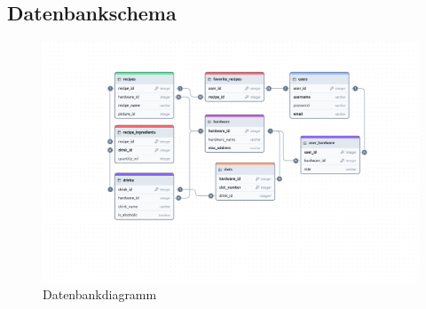 \newpage
\subsection{Datenbankschema}

\begin{figure}[H]
  \centering
\includegraphics[height=0.96\textwidth, angle=270]{graphics/schemes/postgres_db_scheme.png}
  \caption{Datenbankdiagramm}
  \label{fig:database_diagram}
\end{figure}

\newpage

